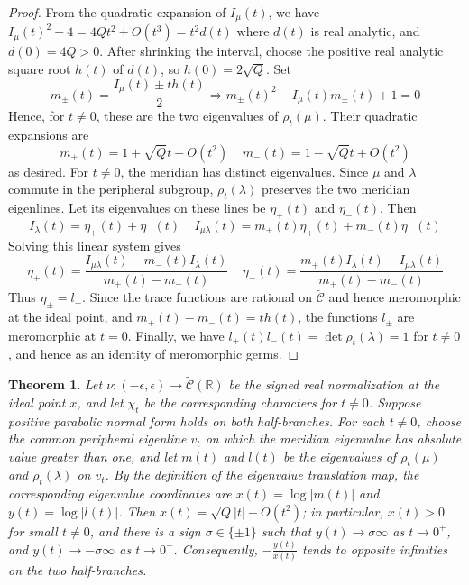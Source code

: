 \documentclass{article}
\theoremstyle{plain}
\newtheorem{theorem}{Theorem}[section]
\theoremstyle{definition}
\theoremstyle{plain}
\theoremstyle{plain}
\theoremstyle{plain}
\theoremstyle{remark}
\theoremstyle{remark}
\theoremstyle{plain}
\theoremstyle{plain}
\theoremstyle{plain}
\theoremstyle{plain}
\begin{document}
\begin{proof}
From the quadratic expansion of $I_\mu(t)$, we have $I_\mu(t)^2 - 4 = 4Qt^2 + O(t^3) = t^2d(t)$ where $d(t)$ is real analytic, and $d(0) = 4Q > 0$. After shrinking the interval, choose the positive real analytic square root $h(t)$ of $d(t)$, so $h(0) = 2\sqrt{Q}$. Set
\begin{equation*}
	m_\pm(t) = \frac{I_\mu(t)\pm th(t)}{2} \Longrightarrow m_\pm(t)^2 - I_\mu(t)m_\pm(t) + 1 = 0
\end{equation*}
Hence, for $t \neq 0$, these are the two eigenvalues of $\rho_t(\mu)$. Their quadratic expansions are 
\begin{equation*}
	m_+(t) = 1 + \sqrt{Q}t + O(t^2) \ \ \ \ \ m_-(t) = 1 - \sqrt{Q}t + O(t^2)
\end{equation*}
as desired. For $t\neq0$, the meridian has distinct eigenvalues. Since $\mu$ and $\lambda$ commute in the peripheral subgroup, $\rho_t(\lambda)$ preserves the two meridian eigenlines. Let its eigenvalues on these lines be $\eta_+(t)$ and $\eta_-(t)$. Then
\begin{equation*}
	I_\lambda(t) = \eta_+(t) + \eta_-(t) \ \ \ \ \ I_{\mu\lambda}(t) = m_+(t)\eta_+(t)+ m_-(t)\eta_-(t)
\end{equation*}
Solving this linear system gives 
\begin{equation*}
	\eta_+(t) = \frac{I_{\mu\lambda}(t)-m_-(t)I_\lambda(t)}{m_+(t)-m_-(t)} \ \ \ \ \ \eta_-(t)
	= \frac{m_+(t)I_\lambda(t)-I_{\mu\lambda}(t)}{m_+(t)-m_-(t)}
\end{equation*}
Thus $\eta_\pm=l_\pm$. Since the trace functions are rational on $\widetilde{\mathcal C}$ and hence meromorphic at the ideal point, and $m_+(t) - m_-(t) = th(t)$, the functions $l_\pm$ are meromorphic at $t=0$. Finally, we have $l_+(t)l_-(t) = \det\rho_t(\lambda) = 1$ for $t \neq 0$, and hence as an identity of meromorphic germs. 
\end{proof}

\begin{theorem}\label{thm:asymptote}
Let $\nu: (-\epsilon, \epsilon) \to \widetilde{\mathcal{C}}(\mathbb{R})$ be the signed real normalization at the ideal point $x$, and let $\chi_t$ be the corresponding characters for $t \neq 0$. Suppose positive parabolic normal form holds on both half-branches. For each $t \neq 0$, choose the common peripheral eigenline $v_t$ on which the meridian eigenvalue has absolute value greater than one, and let $m(t)$ and $l(t)$ be the eigenvalues of $\rho_t(\mu)$ and $\rho_t(\lambda)$ on $v_t$. By the definition of the eigenvalue translation map, the corresponding eigenvalue coordinates are $x(t)=\log|m(t)|$ and $y(t)=\log|l(t)|$. Then $x(t) = \sqrt Q|t| + O(t^2)$; in particular, $x(t) > 0$ for small $t \neq 0$, and there is a sign $\sigma \in \{\pm 1\}$ such that $y(t) \to \sigma\infty$ as $t \to 0^+$, and $y(t) \to -\sigma\infty$ as $t \to 0^-$. Consequently, $-\frac{y(t)}{x(t)}$ tends to opposite infinities on the two half-branches.
\end{theorem}
\end{document}
